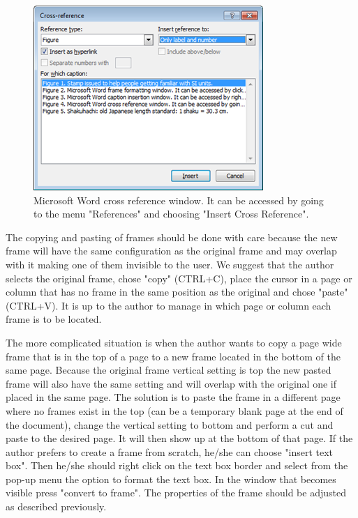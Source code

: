 \documentclass[10pt]{../imeko_acta}
\begin{document}
\begin{figure}[!t]
	\centering
	\includegraphics[width=\columnwidth]{image4}
	\caption{Microsoft Word cross reference window. It can be accessed by going to the menu "References" and choosing "Insert Cross Reference".}
	\label{fig:image4}
\end{figure}







The copying and pasting of frames should be done with care because the new frame will have the same configuration as the original frame and may overlap with it making one of them invisible to the user. We suggest that the author selects the original frame, chose "copy" (CTRL+C), place the cursor in a page or column that has no frame in the same position as the original and chose "paste" (CTRL+V). It is up to the author to manage in which page or column each frame is to be located.

The more complicated situation is when the author wants to copy a page wide frame that is in the top of a page to a new frame located in the bottom of the same page. Because the original frame vertical setting is top the new pasted frame will also have the same setting and will overlap with the original one if placed in the same page. The solution is to paste the frame in a different page where no frames exist in the top (can be a temporary blank page at the end of the document), change the vertical setting to bottom and perform a cut and paste to the desired page. It will then show up at the bottom of that page.
If the author prefers to create a frame from scratch, he/she can choose "insert text box". Then he/she should right click on the text box border and select from the pop-up menu the option to format the text box. In the window that becomes visible press "convert to frame". The properties of the frame should be adjusted as described previously.
\end{document}
